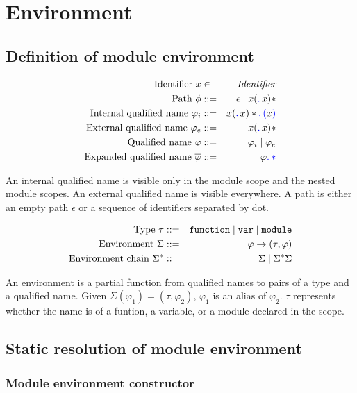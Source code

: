 \documentclass[a4paper]{article}
\newcommand{\Identifier}{\emph{Identifier}}
\newcommand{\code}[1]{\textcolor{blue}{\tt #1}}
\newcommand{\mydot}{.\,}
\newcommand{\clparen}{\code{(}}
\newcommand{\crparen}{\code{)}}
\newcommand{\var}{{\tt{var}}}
\newcommand{\function}{{\tt{function}}}
\newcommand{\module}{{\tt{module}}}
\begin{document}
\section{Environment}

\subsection{Definition of module environment}

\begin{eqnarray*}
\mbox{Identifier}\ x & \in & \Identifier \\
\mbox{Path}\ \phi & ::= & \epsilon \mid x(\code{\mydot}x)* \\
\mbox{Internal qualified name}\ \varphi_i & ::= & x(\code{\mydot}x)*\code{\mydot}\clparen x \crparen \\
\mbox{External qualified name}\ \varphi_e & ::= & x(\code{\mydot}x)* \\
\mbox{Qualified name}\ \varphi & ::= & \varphi_i \mid \varphi_e \\
\mbox{Expanded qualified name}\ \overline{\varphi} & ::= & \varphi\code{\mydot*}
\end{eqnarray*}

An internal qualified name is visible only in the module scope and the nested module scopes.
An external qualified name is visible everywhere.
A path is either an empty path $\epsilon$ or a sequence of identifiers separated by dot.

\begin{eqnarray*}
\mbox{Type}\ \tau & ::= & \function \mid \var \mid \module \\
\mbox{Environment}\ \Sigma & ::= & \varphi \rightarrow (\tau, \varphi) \\
\mbox{Environment chain}\ \Sigma^* & ::= & \Sigma \mid \Sigma^* \Sigma
\end{eqnarray*}

An environment is a partial function from qualified names to pairs of a type and a qualified name.
Given $\Sigma(\varphi_1) = (\tau, \varphi_2)$, $\varphi_1$ is an alias of $\varphi_2$.
$\tau$ represents whether the name is of a funtion, a variable, or a module declared in the scope.

\subsection{Static resolution of module environment}

\subsubsection{Module environment constructor}
\end{document}

